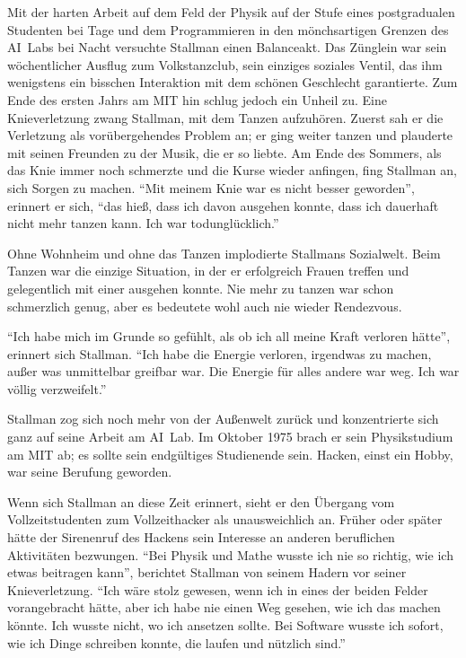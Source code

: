 Mit der harten Arbeit auf dem Feld der Physik auf der Stufe eines postgradualen Studenten bei Tage und dem Programmieren in den mönchsartigen Grenzen des AI~Labs bei Nacht versuchte Stallman einen Balanceakt. Das Zünglein war sein wöchentlicher Ausflug zum Volkstanzclub, sein einziges soziales Ventil, das ihm wenigstens ein bisschen Interaktion mit dem schönen Geschlecht garantierte. Zum Ende des ersten Jahrs am MIT hin schlug jedoch ein Unheil zu. Eine Knieverletzung zwang Stallman, mit dem Tanzen aufzuhören. Zuerst sah er die Verletzung als vorübergehendes Problem an; er ging weiter tanzen und plauderte mit seinen Freunden zu der Musik, die er so liebte. Am Ende des Sommers, als das Knie immer noch schmerzte und die Kurse wieder anfingen, fing Stallman an, sich Sorgen zu machen. "`Mit meinem Knie war es nicht besser geworden"', erinnert er sich, "`das hieß, dass ich davon ausgehen konnte, dass ich dauerhaft nicht mehr tanzen kann. Ich war todunglücklich."'

Ohne Wohnheim und ohne das Tanzen implodierte Stallmans Sozialwelt. Beim Tanzen war die einzige Situation, in der er erfolgreich Frauen treffen und gelegentlich mit einer ausgehen konnte. Nie mehr zu tanzen war schon schmerzlich genug, aber es bedeutete wohl auch nie wieder Rendezvous.

"`Ich habe mich im Grunde so gefühlt, als ob ich all meine Kraft verloren hätte"', erinnert sich Stallman. "`Ich habe die Energie verloren, irgendwas zu machen, außer was unmittelbar greifbar war. Die Energie für alles andere war weg. Ich war völlig verzweifelt."'

Stallman zog sich noch mehr von der Außenwelt zurück und konzentrierte sich ganz auf seine Arbeit am AI~Lab. Im Oktober 1975 brach er sein Physikstudium am MIT ab; es sollte sein endgültiges Studienende sein. Hacken, einst ein Hobby, war seine Berufung geworden.

Wenn sich Stallman an diese Zeit erinnert, sieht er den Übergang vom Vollzeitstudenten zum Vollzeithacker als unausweichlich an. Früher oder später hätte der Sirenenruf des Hackens sein Interesse an anderen beruflichen Aktivitäten bezwungen. "`Bei Physik und Mathe wusste ich nie so richtig, wie ich etwas beitragen kann"', berichtet Stallman von seinem  Hadern vor seiner Knieverletzung. "`Ich wäre stolz gewesen, wenn ich in eines der beiden Felder vorangebracht hätte, aber ich habe nie einen Weg gesehen, wie ich das machen könnte. Ich wusste nicht, wo ich ansetzen sollte. Bei Software wusste ich sofort, wie ich Dinge schreiben konnte, die laufen und nützlich sind."'

